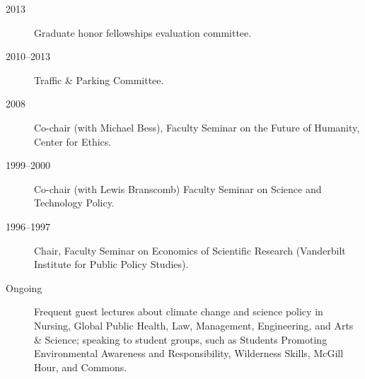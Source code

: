 \documentclass[10pt]{article}
\begin{document}
\begin{description}
    	    \item[2013] Graduate honor fellowships evaluation committee.
    		\item[2010--2013] Traffic \& Parking Committee.
    		\item[2008] Co-chair (with Michael Bess), Faculty Seminar on the Future of Humanity, Center for Ethics.
    		\item[1999--2000] Co-chair (with Lewis Branscomb) Faculty Seminar on Science and Technology Policy.
    		\item[1996--1997] Chair, Faculty Seminar on Economics of Scientific Research (Vanderbilt Institute for Public Policy Studies).
    		\item[Ongoing] Frequent guest lectures about climate change and science policy in Nursing, Global Public Health, Law, Management, Engineering, and Arts \& Science; speaking to student groups, such as Students Promoting Environmental Awareness and Responsibility, Wilderness Skills, McGill Hour, and Commons.
    	\end{description}
\end{document}
